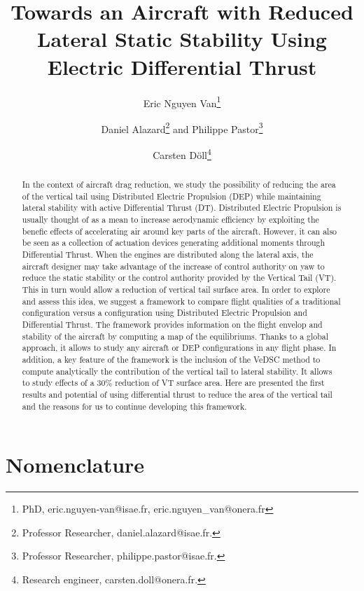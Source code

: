 \documentclass[conf]{new-aiaa} %
\title{Towards an Aircraft with Reduced Lateral Static Stability Using Electric Differential Thrust}
\author{Eric Nguyen Van\footnote{PhD, eric.nguyen-van@isae.fr, eric.nguyen\_van@onera.fr}}
\affil{ISAE DCAS, Toulouse, France}
\affil{ONERA DTIS, Toulouse France}
\author{Daniel Alazard\footnote{Professor Researcher, daniel.alazard@isae.fr.} and Philippe Pastor\footnote{Professor Researcher, philippe.pastor@isae.fr.}}
\affil{ISAE DCAS, Toulouse, France}
\author{Carsten D\"oll\footnote{Research engineer, carsten.doll@onera.fr.}}
\affil{ONERA DTIS, Toulouse, France}
\begin{document}
\maketitle

\begin{abstract}
In the context of aircraft drag reduction, we study the possibility of reducing the area of the vertical tail using Distributed Electric Propulsion (DEP) while maintaining lateral stability with active Differential Thrust (DT). Distributed Electric Propulsion is usually thought of as a mean to increase aerodynamic efficiency by exploiting the benefic effects of accelerating air around key parts of the aircraft. However, it can also be seen as a collection of actuation devices generating additional moments through Differential Thrust. When the engines are distributed along the lateral axis, the aircraft designer may take advantage of the increase of control authority on yaw to reduce the static stability or the control authority provided by the Vertical Tail (VT). This in turn would allow a reduction of vertical tail surface area. In order to explore and assess this idea, we suggest a framework to compare flight qualities of a traditional configuration versus a configuration using Distributed Electric Propulsion and Differential Thrust. The framework provides information on the flight envelop and stability of the aircraft by computing a map of the equilibriums. Thanks to a global approach, it allows to study any aircraft or DEP configurations in any flight phase. In addition, a key feature of the framework is the inclusion of the VeDSC\cite{NicolosiNewApproach} method to compute analytically the contribution of the vertical tail to lateral stability. It allows to study effects of a 30\% reduction of VT surface area. Here are presented the first results and potential of using differential thrust to reduce the area of the vertical tail and the reasons for us to continue developing this framework.
\end{abstract}

\clearpage

\section*{Nomenclature}

\end{document}
